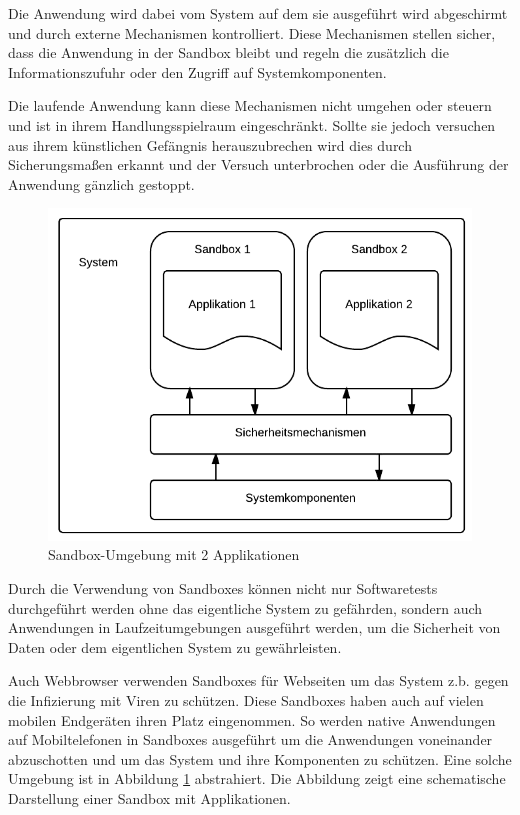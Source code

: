 Die Anwendung wird dabei vom System auf dem sie ausgeführt wird abgeschirmt und durch externe Mechanismen kontrolliert. Diese Mechanismen stellen sicher, dass die Anwendung in der Sandbox bleibt und regeln die zusätzlich die Informationszufuhr oder den Zugriff auf Systemkomponenten.

Die laufende Anwendung kann diese Mechanismen nicht umgehen oder steuern und ist in ihrem Handlungsspielraum eingeschränkt. Sollte sie jedoch versuchen aus ihrem künstlichen Gefängnis herauszubrechen wird dies durch Sicherungsmaßen erkannt und der Versuch unterbrochen oder die Ausführung der Anwendung gänzlich gestoppt.

\begin{figure}[ht!]
\begin{center}
\includegraphics[scale=0.4]{images/sandbox}
\caption{Sandbox-Umgebung mit 2 Applikationen}
\label{sandbox_pic}
\end{center}
\end{figure}

Durch die Verwendung von Sandboxes können nicht nur Softwaretests durchgeführt werden ohne das eigentliche System zu gefährden, sondern auch Anwendungen in Laufzeitumgebungen ausgeführt werden, um die Sicherheit von Daten oder dem eigentlichen System zu gewährleisten. 

Auch Webbrowser verwenden Sandboxes für Webseiten um das System z.b. gegen die Infizierung mit Viren zu schützen. Diese Sandboxes haben auch auf vielen mobilen Endgeräten ihren Platz eingenommen. So werden native Anwendungen auf Mobiltelefonen in Sandboxes ausgeführt um die Anwendungen voneinander abzuschotten und um das System und ihre Komponenten zu schützen. Eine solche Umgebung ist in Abbildung \ref{sandbox_pic} abstrahiert. Die Abbildung zeigt eine schematische Darstellung einer Sandbox mit Applikationen.

